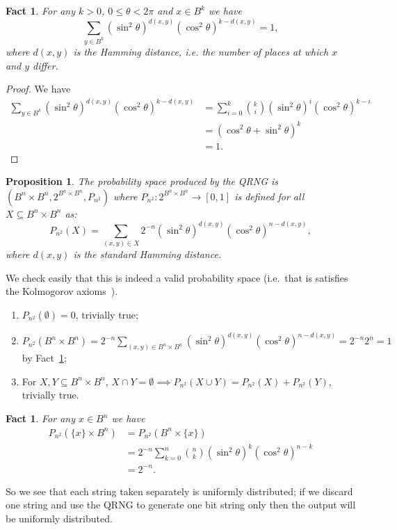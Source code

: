 \documentclass{mscs}
\newtheorem{Proposition}[Theorem]{Proposition}
\newtheorem{Fact}[Theorem]{Fact}
\begin{document}
\begin{Fact}\label{fact:TrigBinom}
	For any $k > 0$, $0\le \theta < 2\pi$ and $x\in B^k$ we have $$\sum_{y\in B^k}(\sin^2 \theta)^{d(x,y)}(\cos^2\theta)^{k-d(x,y)} = 1,$$ where $d(x,y)$ is the Hamming distance, i.e. the number of places at which $x$ and $y$ differ.
\end{Fact}
\begin{proof}
	We have
	\begin{align*}
		\sum_{y\in B^k}(\sin^2 \theta)^{d(x,y)}(\cos^2\theta)^{k-d(x,y)} &= \sum_{i=0}^k\binom{k}{i}(\sin^2 \theta)^{i}(\cos^2\theta)^{k-i}\\
		&= (\cos^2\theta + \sin^2\theta)^k\\
		&= 1.
	\end{align*}
\end{proof}
\begin{Proposition}\label{outputProbSpace}
	The probability space produced by the QRNG is $(B^n\times B^n,2^{B^n\times B^n},P_{n^2})$ where $P_{n^2}: 2^{B^n\times B^n} \to [0,1]$ is defined for all $X\subseteq B^n\times B^n$ as:
	$$P_{n^2}(X)=\sum_{(x,y)\in X}2^{-n}(\sin^2\theta)^{d(x,y)}(\cos^2\theta)^{n-d(x,y)},$$
	where $d(x,y)$ is the standard Hamming distance.
\end{Proposition}
We check easily that this is indeed a valid probability space (i.e.\ that is satisfies the Kolmogorov axioms~\citep{Billingsley:1979aa}).
\begin{enumerate}
	\item $P_{n^2}(\emptyset) = 0$, trivially true;
	\item $P_{n^2}(B^n\times B^n) = 2^{-n}\sum_{(x,y)\in B^n\times B^n}(\sin^2\theta)^{d(x,y)}(\cos^2\theta)^{n-d(x,y)} = 2^{-n} 2^n = 1$ by Fact~\ref{fact:TrigBinom};
	\item For $X,Y\subseteq B^n\times B^n$, $X\cap Y=\emptyset \implies P_{n^2}(X \cup Y) = P_{n^2}(X) + P_{n^2}(Y)$, trivially true.
\end{enumerate}

\begin{Fact}
	For any $x\in B^n$ we have
	\begin{align*}
		P_{n^2}(\{x\} \times B^n) &= P_{n^2}(B^n \times \{x\})\\
		&= 2^{-n}\sum_{k=0}^n\binom{n}{k}(\sin^2\theta)^k(\cos^2\theta)^{n-k}\\
		&= 2^{-n}.
	\end{align*}
\end{Fact}
So we see that each string taken separately is uniformly distributed; if we discard one string and use the QRNG to generate one bit string only then the output will be uniformly distributed.
\end{document}
